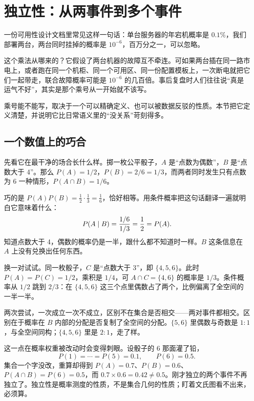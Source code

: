 \section{独立性：从两事件到多个事件}
\label{sec:05-Probability/02-Conditional-Probability/03}

一份可用性设计文档里常见这样一句话：单台服务器的年宕机概率是 \(0.1\%\)，我们部署两台，两台同时挂掉的概率是 \(10^{-6}\)，百万分之一，可以忽略。

这个乘法从哪来的？它假设了两台机器的故障互不牵连。可如果两台插在同一路市电上，或者跑在同一个机柜、同一个可用区、同一份配置模板上，一次断电就把它们一起带走，联合故障概率可能是 \(10^{-6}\) 的几百倍。事后复盘时人们往往说``真是运气不好''，其实是那个乘号从一开始就不该写。

乘号能不能写，取决于一个可以精确定义、也可以被数据反驳的性质。本节把它定义清楚，并说明它比日常语义里的``没关系''苛刻得多。

\subsection{一个数值上的巧合}

先看它在最干净的场合长什么样。掷一枚公平骰子，\(A\) 是``点数为偶数''，\(B\) 是``点数大于 4''。那么 \(P(A)=1/2\)，\(P(B)=2/6=1/3\)，而两者同时发生只有点数为 6 一种情形，\(P(A\cap B)=1/6\)。

巧的是 \(P(A)P(B)=\tfrac12\cdot\tfrac13=\tfrac16\)，恰好相等。用条件概率把这句话翻译一遍就明白它意味着什么：
\[
P(A\mid B)=\frac{1/6}{1/3}=\frac12=P(A).
\]
知道点数大于 4，偶数的概率仍是一半，跟什么都不知道时一样。\(B\) 这条信息在 \(A\) 上没有兑换出任何东西。

换一对试试。同一枚骰子，\(C\) 是``点数大于 3''，即 \(\{4,5,6\}\)。此时 \(P(A)=P(C)=1/2\)，乘积是 \(1/4\)，可 \(A\cap C=\{4,6\}\) 的概率是 \(1/3\)。条件概率从 \(1/2\) 跳到 \(2/3\)：在 \(\{4,5,6\}\) 这三个点里偶数占了两个，比例偏离了全空间的一半一半。

两次尝试，一次成立一次不成立，区别不在集合是否相交——两对事件都相交。区别在于概率在 \(B\) 内部的分配是否复制了全空间的分配。\(\{5,6\}\) 里偶数与奇数是 \(1:1\)，与全空间同构；\(\{4,5,6\}\) 里是 \(2:1\)，走了样。

这一点在概率权重被改动时会变得刺眼。设骰子的 6 那面灌了铅，
\[
P(1)=\cdots=P(5)=0.1,\qquad P(6)=0.5.
\]
集合一个字没改，重算却得到 \(P(A)=0.7\)、\(P(B)=0.6\)、\(P(A\cap B)=P(6)=0.5\)，而 \(0.7\times0.6=0.42\ne0.5\)。刚才独立的两个事件不再独立了。独立性是概率测度的性质，不是集合几何的性质；盯着文氏图看不出来，必须算。

